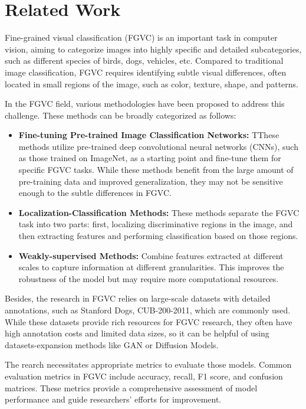 \section{Related Work}
\label{sec:related_work}

Fine-grained visual classification (FGVC) is an important task in computer vision, aiming to categorize images into highly specific and detailed subcategories, such as different species of birds, dogs, vehicles, etc. Compared to traditional image classification, FGVC requires identifying subtle visual differences, often located in small regions of the image, such as color, texture, shape, and patterns.

In the FGVC field, various methodologies have been proposed to address this challenge. These methods can be broadly categorized as follows:
\begin{itemize}
    \item \textbf{Fine-tuning Pre-trained Image Classification Networks:} TThese methods utilize pre-trained deep convolutional neural networks (CNNs), such as those trained on ImageNet, as a starting point and fine-tune them for specific FGVC tasks. While these methods benefit from the large amount of pre-training data and improved generalization, they may not be sensitive enough to the subtle differences in FGVC.
    \item \textbf{Localization-Classification Methods:} These methods separate the FGVC task into two parts: first, localizing discriminative regions in the image, and then extracting features and performing classification based on those regions.
    \item \textbf{Weakly-supervised Methods:} Combine features extracted at different scales to capture information at different granularities. This improves the robustness of the model but may require more computational resources.
\end{itemize}

Besides, the research in FGVC relies on large-scale datasets with detailed annotations, such as Stanford Dogs, CUB-200-2011, which are commonly used. While these datasets provide rich resources for FGVC research, they often have high annotation costs and limited data sizes, so it can be helpful of using datasets-expansion methods like GAN or Diffusion Models. 

The rearch necessitates appropriate metrics to evaluate those models. Common evaluation metrics in FGVC include accuracy, recall, F1 score, and confusion matrices. These metrics provide a comprehensive assessment of model performance and guide researchers' efforts for improvement.

